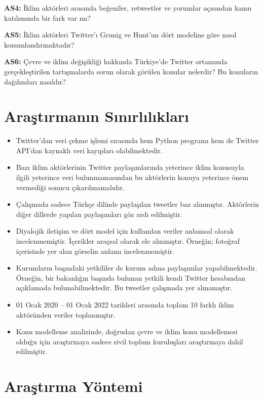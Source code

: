 \documentclass[
]{book}
\begin{document}
\textbf{AS4:} İklim aktörleri arasında beğeniler, retweetler ve yorumlar açısından kamu katılımında bir fark var mı?

\textbf{AS5:} İklim aktörleri Twitter'ı Grunig ve Hunt'un dört modeline göre nasıl konumlandırmaktadır?

\textbf{AS6:} Çevre ve iklim değişikliği hakkında Türkiye'de Twitter ortamında gerçekleştirilen tartışmalarda sorun olarak görülen konular nelerdir? Bu konuların dağılımları nasıldır?

\hypertarget{araux15ftux131rmanux131n-sux131nux131rlux131lux131klarux131}{%
\section{Araştırmanın Sınırlılıkları}\label{araux15ftux131rmanux131n-sux131nux131rlux131lux131klarux131}}

\begin{itemize}
\item
  Twitter'dan veri çekme işlemi sırasında hem Python programı hem de Twitter API'dan kaynaklı veri kayıpları olabilmektedir.
\item
  Bazı iklim aktörlerinin Twitter paylaşımlarında yeterince iklim konusuyla ilgili yeterince veri bulunmamasından bu aktörlerin konuya yeterince önem vermediği sonucu çıkarılmamalıdır.
\item
  Çalışmada sadece Türkçe dilinde paylaşılan tweetler baz alınmıştır. Aktörlerin diğer dillerde yapılan paylaşımları göz ardı edilmiştir.
\item
  Diyalojik iletişim ve dört model için kullanılan veriler anlamsal olarak incelenmemiştir. İçerikler araçsal olarak ele alınmıştır. Örneğin; fotoğraf içerisinde yer alan görselin anlamı incelenmemiştir.
\item
  Kurumların başındaki yetkililer de kurum adına paylaşımlar yapabilmektedir. Örneğin, bir bakanlığın başında bulunan yetkili kendi Twitter hesabından açıklamada bulunabilmektedir. Bu tweetler çalışmada yer almamıştır.
\item
  01 Ocak 2020 -- 01 Ocak 2022 tarihleri arasında toplam 10 farklı iklim aktöründen veriler toplanmıştır.
\item
  Konu modelleme analizinde, doğrudan çevre ve iklim konu modellemesi olduğu için araştırmaya sadece sivil toplum kuruluşları araştırmaya dahil edilmiştir.
\end{itemize}

\hypertarget{araux15ftux131rma-yuxf6ntemi}{%
\section{Araştırma Yöntemi}\label{araux15ftux131rma-yuxf6ntemi}}
\end{document}
